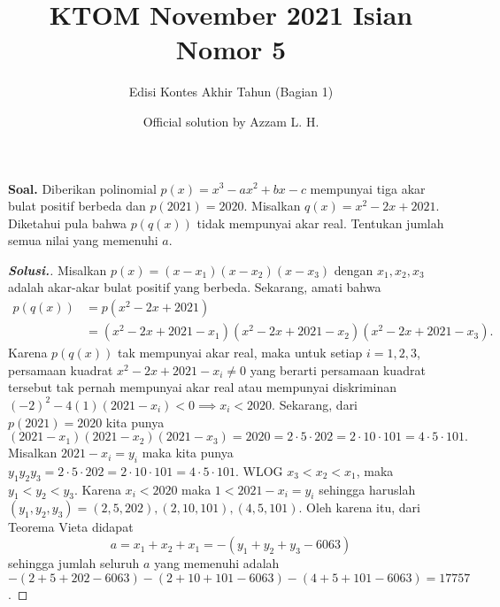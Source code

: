 \documentclass[12pt]{scrartcl}
\title{KTOM November 2021 Isian Nomor 5}
\author{Edisi Kontes Akhir Tahun (Bagian 1)}
\date{Official solution by Azzam L. H.}
\begin{document}
\maketitle
\pagestyle{plain}
\noindent

  \textbf{Soal.} Diberikan polinomial $p(x)=x^3-ax^2+bx-c$ mempunyai tiga akar bulat positif berbeda dan $p(2021)=2020$. Misalkan $q(x)=x^2-2x+2021$. Diketahui pula bahwa $p(q(x))$ tidak mempunyai akar real. Tentukan jumlah semua nilai yang memenuhi $a$.
  \newpage
  	 \begin{proof}[\textbf{Solusi.}]
  	 Misalkan $p(x)=(x-x_1)(x-x_2)(x-x_3)$ dengan $x_1,x_2,x_3$ adalah akar-akar bulat positif yang berbeda.  Sekarang, amati bahwa
  	 \begin{align*}
  	 p(q(x))&=p(x^2-2x+2021)\\
  	 &=(x^2-2x+2021-x_1)(x^2-2x+2021-x_2)(x^2-2x+2021-x_3).
  	 \end{align*}
  	  Karena $p(q(x))$ tak mempunyai akar real, maka  untuk setiap $i=1,2,3$, persamaan kuadrat $x^2-2x+2021-x_i \neq 0$ yang berarti persamaan kuadrat tersebut tak pernah mempunyai akar real atau mempunyai diskriminan $(-2)^2-4(1)(2021-x_i) < 0 \implies x_i < 2020$. Sekarang, dari $p(2021)=2020$ kita punya $$(2021-x_1)(2021-x_2)(2021-x_3)=2020=2\cdot 5 \cdot 202=2\cdot 10 \cdot 101=4\cdot 5 \cdot 101.$$  Misalkan $2021-x_i = y_i$ maka kita punya $y_1y_2y_3=2\cdot 5 \cdot 202=2\cdot 10 \cdot 101=4\cdot 5 \cdot 101$. WLOG $x_3 < x_2 < x_1$, maka $y_1 < y_2<y_3$. Karena $x_i < 2020$ maka $1 < 2021 - x_i = y_i$ sehingga haruslah $(y_1,y_2,y_3)=(2,5,202),(2,10,101),(4,5,101)$.
  	Oleh karena itu, dari Teorema Vieta didapat $$a=x_1+x_2+x_1=-(y_1+y_2+y_3-6063)$$ sehingga jumlah seluruh $a$ yang memenuhi adalah $-(2+5+202-6063)-(2+10+101-6063)-(4+5+101-6063)=\boxed{17757}$.
  	\end{proof}
\end{document}
